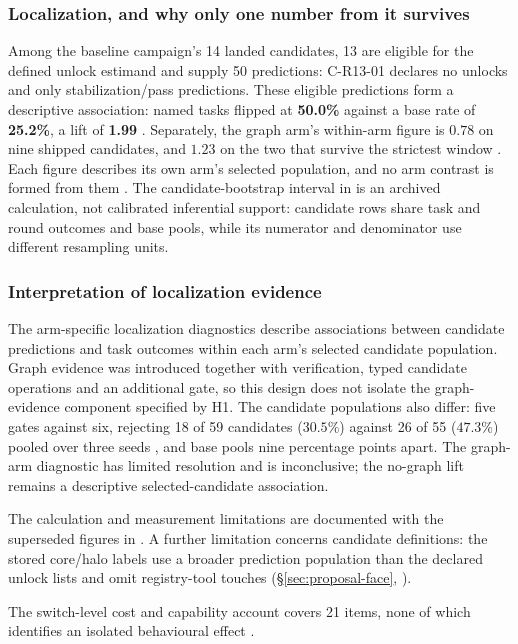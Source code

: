 \subsubsection*{Localization, and why only one number from it survives}

Among the baseline campaign's 14 landed candidates, 13 are eligible for
the defined unlock estimand and supply 50 predictions: C-R13-01 declares no
unlocks and only stabilization/pass predictions. These eligible predictions
form a descriptive association: named tasks flipped
at \textbf{50.0\%} against a base rate of \textbf{25.2\%}, a lift of
\textbf{1.99} . Separately, the graph arm's within-arm figure is
$0.78$ on nine shipped candidates, and $1.23$ on the two that survive the
strictest window . Each figure describes its own arm's selected
population, and no arm contrast is formed from them . The candidate-bootstrap interval in  is an
archived calculation, not calibrated inferential support: candidate rows
share task and round outcomes and base pools, while its numerator and
denominator use different resampling units.

\subsubsection*{Interpretation of localization evidence}

The arm-specific localization diagnostics describe associations between
candidate predictions and task outcomes within each arm's selected candidate
population. Graph evidence was introduced together with verification, typed
candidate operations and an additional gate, so this design does not isolate
the graph-evidence component specified by H1. The candidate populations also
differ: five gates against six, rejecting 18 of 59 candidates ($30.5\%$) against 26
of 55 ($47.3\%$) pooled over three seeds , and base pools
nine percentage points apart. The graph-arm diagnostic has limited resolution
and is inconclusive; the no-graph lift remains a descriptive selected-candidate
association.

The calculation and measurement limitations are documented with the
superseded figures in . A further limitation concerns
candidate definitions: the stored core/halo labels use a broader prediction
population than the declared unlock lists and omit registry-tool touches
(\S\ref{sec:proposal-face}, ).

The switch-level
cost and capability account covers 21 items, none of which identifies an isolated behavioural effect .


